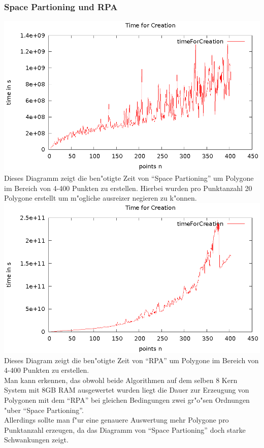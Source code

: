     \subsubsection{Space Partioning und RPA}
      \includegraphics{img/sp_diagram_0.eps}\\
      Dieses Diagramm zeigt die ben"otigte Zeit von \enquote{Space Partioning} um 
      Polygone im Bereich von 4-400 Punkten zu erstellen. Hierbei wurden pro 
      Punktanzahl 20 Polygone erstellt um m"ogliche ausreizer negieren zu k"onnen.\\
      \includegraphics{img/rpa_diagram_0.eps}\\
      Dieses Diagram zeigt die ben"otigte Zeit von \enquote{RPA} um Polygone
      im Bereich von 4-400 Punkten zu erstellen.\\
      Man kann erkennen, das obwohl beide Algorithmen auf dem selben 8 Kern
      System mit 8GB RAM ausgewertet wurden liegt die Dauer zur Erzeugung von 
      Polygonen mit dem \enquote{RPA} bei gleichen Bedingungen zwei gr"o"sen 
      Ordnungen "uber \enquote{Space Partioning}.\\
      Allerdings sollte man f"ur eine genauere Auswertung mehr Polygone pro
      Punktanzahl erzeugen, da das Diagramm von \enquote{Space Partioning} doch
      starke Schwankungen zeigt.
